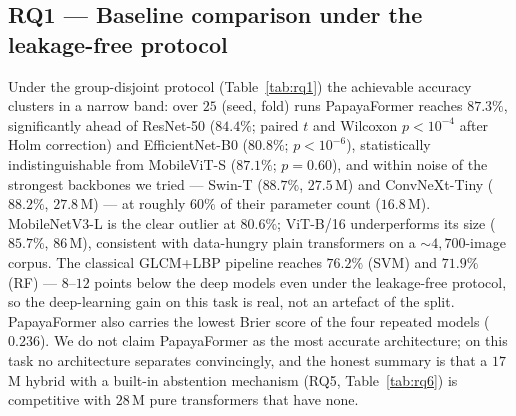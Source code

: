 \documentclass[10pt,twocolumn,a4paper]{article}
\begin{document}
\subsection{RQ1 --- Baseline comparison under the leakage-free protocol}
Under the group-disjoint protocol (Table~\ref{tab:rq1}) the achievable accuracy clusters in a narrow band: over $25$ (seed, fold) runs PapayaFormer reaches $87.3\%$, significantly ahead of ResNet-50 ($84.4\%$; paired $t$ and Wilcoxon $p<10^{-4}$ after Holm correction) and EfficientNet-B0 ($80.8\%$; $p<10^{-6}$), statistically indistinguishable from MobileViT-S ($87.1\%$; $p=0.60$), and within noise of the strongest backbones we tried --- Swin-T ($88.7\%$, $27.5$\,M) and ConvNeXt-Tiny ($88.2\%$, $27.8$\,M) --- at roughly $60\%$ of their parameter count ($16.8$\,M). MobileNetV3-L is the clear outlier at $80.6\%$; ViT-B/16 underperforms its size ($85.7\%$, $86$\,M), consistent with data-hungry plain transformers on a $\sim4{,}700$-image corpus. The classical GLCM+LBP pipeline reaches $76.2\%$ (SVM) and $71.9\%$ (RF) --- $8$--$12$ points below the deep models even under the leakage-free protocol, so the deep-learning gain on this task is real, not an artefact of the split. PapayaFormer also carries the lowest Brier score of the four repeated models ($0.236$). We do not claim PapayaFormer as the most accurate architecture; on this task no architecture separates convincingly, and the honest summary is that a $17$\,M hybrid with a built-in abstention mechanism (RQ5, Table~\ref{tab:rq6}) is competitive with $28$\,M pure transformers that have none.
\end{document}

